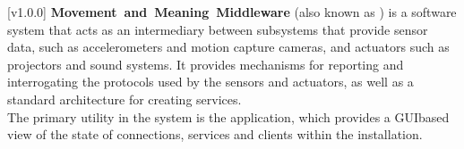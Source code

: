 [v1.0.0]
\textbf{Movement~and~Meaning~Middleware} (also known as \mplusm) is a software system
that acts as an intermediary between subsystems that provide sensor data, such as
accelerometers and motion capture cameras, and actuators such as projectors and sound
systems.
It provides mechanisms for reporting and interrogating the protocols used by the sensors
and actuators, as well as a standard architecture for creating services.\\

The primary utility in the \mplusm{} system is the \emph{\CMU} application, which provides
a GUI\longDash{}based view of the state of connections, services and clients within the
installation.
\primaryEnd{}
